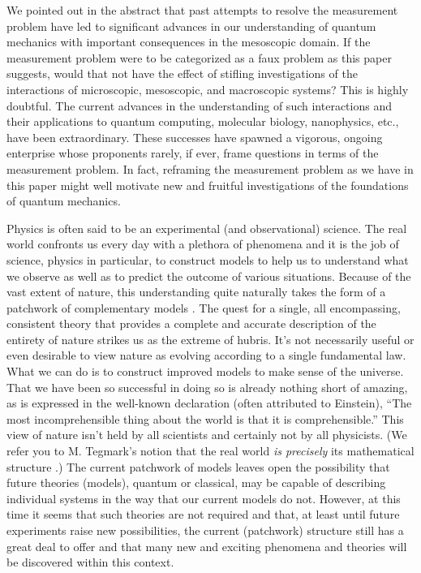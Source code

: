 \documentclass [12pt]{revtex4}
\begin{document}
We pointed out in the abstract that past attempts to resolve the
measurement problem have led to significant advances in our understanding
of quantum mechanics with important consequences in the mesoscopic
domain.  If the measurement problem were to be categorized as a faux
problem as this paper suggests, would that not have the effect of stifling
investigations of the interactions of microscopic, mesoscopic, and
macroscopic systems?  This is highly doubtful.  The current advances in the
understanding of such interactions and their applications to quantum
computing, molecular biology, nanophysics, etc., have been extraordinary.
These successes have spawned a vigorous, ongoing enterprise whose
proponents rarely, if ever, frame questions in terms of the measurement
problem.  In fact, reframing the measurement problem as we have in this paper
might well motivate new and fruitful investigations of the foundations of
quantum mechanics.

Physics is often said to be an experimental (and observational)
science. The real world confronts us every day with a
plethora of phenomena and it is the job of science, physics in
particular, to construct models to help us to understand what we
observe as well as to predict the outcome of various situations.
Because of the vast extent of nature, this understanding quite
naturally takes the form of a {patchwork of complementary
models} \cite{S1972}. The quest for a single, all encompassing,
consistent theory that provides a complete and accurate description
of the entirety of nature strikes us as the extreme of hubris. It's
not necessarily useful or even desirable to view nature as evolving according to
a single fundamental law. What we can do is to
construct improved models to make sense of the universe. That we
have been so successful in doing so is already nothing short of
amazing, as is expressed in the well-known declaration
(often attributed to Einstein), ``The
most incomprehensible thing about the world is that it is
comprehensible.'' This view of nature isn't held by all scientists
and certainly not by all physicists. (We refer you to M. Tegmark's
notion that the real world \textit{is precisely} its
mathematical structure \cite{T2008}.) The current patchwork of models leaves open
the possibility that future theories (models), quantum or classical,
may be capable of describing individual systems in the way that our
current models do not. However, at this time it seems that such
theories are not required and that, at least until future experiments
raise new possibilities, the current (patchwork) structure still has
a great deal to offer and that many new and exciting phenomena and
theories will be discovered within this context.
\end{document}
